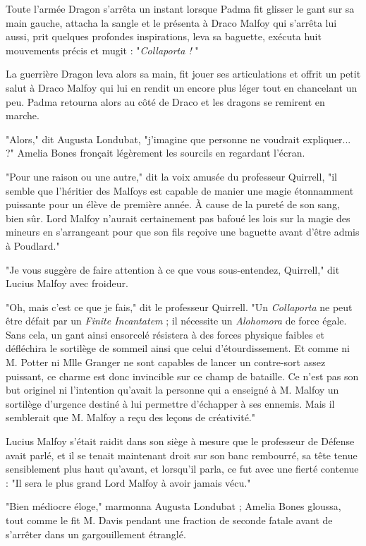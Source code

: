 Toute l'armée Dragon s'arrêta un instant lorsque Padma fit glisser le gant sur sa main gauche, attacha la sangle et le présenta à Draco Malfoy qui s'arrêta lui aussi, prit quelques profondes inspirations, leva sa baguette, exécuta huit mouvements précis et mugit : "\emph{Collaporta !} "

La guerrière Dragon leva alors sa main, fit jouer ses articulations et offrit un petit salut à Draco Malfoy qui lui en rendit un encore plus léger tout en chancelant un peu. Padma retourna alors au côté de Draco et les dragons se remirent en marche.

"Alors," dit Augusta Londubat, "j'imagine que personne ne voudrait expliquer... ?" Amelia Bones fronçait légèrement les sourcils en regardant l'écran.

"Pour une raison ou une autre," dit la voix amusée du professeur Quirrell, "il semble que l'héritier des Malfoys est capable de manier une magie étonnamment puissante pour un élève de première année. À cause de la pureté de son sang, bien sûr. Lord Malfoy n'aurait certainement pas bafoué les lois sur la magie des mineurs en s'arrangeant pour que son fils reçoive une baguette avant d'être admis à Poudlard."

"Je vous suggère de faire attention à ce que vous sous-entendez, Quirrell," dit Lucius Malfoy avec froideur.

"Oh, mais c'est ce que je fais," dit le professeur Quirrell. "Un \emph{Collaporta}  ne peut être défait par un \emph{Finite Incantatem}  ; il nécessite un \emph{Alohomora}  de force égale. Sans cela, un gant ainsi ensorcelé résistera à des forces physique faibles et défléchira le sortilège de sommeil ainsi que celui d'étourdissement. Et comme ni M. Potter ni Mlle Granger ne sont capables de lancer un contre-sort assez puissant, ce charme est donc invincible sur ce champ de bataille. Ce n'est pas son but originel ni l'intention qu'avait la personne qui a enseigné à M. Malfoy un sortilège d'urgence destiné à lui permettre d'échapper à ses ennemis. Mais il semblerait que M. Malfoy a reçu des leçons de créativité."

Lucius Malfoy s'était raidit dans son siège à mesure que le professeur de Défense avait parlé, et il se tenait maintenant droit sur son banc rembourré, sa tête tenue sensiblement plus haut qu'avant, et lorsqu'il parla, ce fut avec une fierté contenue : "Il sera le plus grand Lord Malfoy à avoir jamais vécu."

"Bien médiocre éloge," marmonna Augusta Londubat ; Amelia Bones gloussa, tout comme le fit M. Davis pendant une fraction de seconde fatale avant de s'arrêter dans un gargouillement étranglé.

